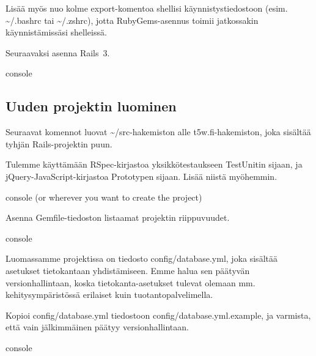 \documentclass{article}
\newcommand{\pdfforeignlanguage}[2]{\texorpdfstring{\foreignlanguage{#1}{#2}}{#2}}
\newcommand{\eng}[1]{\pdfforeignlanguage{english}{#1}}
\begin{document}
Lisää myös nuo kolme export-komentoa shellisi käynnistystiedostoon (esim.
\textasciitilde/.bashrc tai \textasciitilde/.zshrc), jotta RubyGems-asennus
toimii jatkossakin käynnistämissäsi shelleissä.

\begin{samepage}
Seuraavaksi asenna Rails~3.

\begin{pygmented}{console}
\end{pygmented}
\end{samepage}

\subsection{Uuden projektin luominen}

\begin{samepage}
Seuraavat komennot luovat \textasciitilde/src-hakemiston alle
t5w.fi-hakemiston, joka sisältää tyhjän Rails-projektin puun.

Tulemme käyttämään RSpec-kirjastoa yksikkötestaukseen TestUnitin sijaan, ja
jQuery-JavaScript-kirjastoa Prototypen sijaan. Lisää niistä myöhemmin.

\begin{pygmented}{console}
(or wherever you want to create the project)

\end{pygmented}
\end{samepage}

\begin{samepage}
Asenna Gemfile-tiedoston listaamat projektin riippuvuudet.

\begin{pygmented}{console}
\end{pygmented}
\end{samepage}

Luomassamme projektissa on tiedosto \eng{config/database.yml}, joka sisältää
asetukset tietokantaan yhdistämiseen. Emme halua sen päätyvän
versionhallintaan, koska tietokanta-asetukset tulevat olemaan mm.
kehitysympäristössä erilaiset kuin tuotantopalvelimella.

\begin{samepage}
Kopioi \eng{config/database.yml} tiedostoon \eng{config/database.yml.example},
ja varmista, että vain jälkimmäinen päätyy versionhallintaan.

\begin{pygmented}{console}
\end{pygmented}
\end{samepage}
\end{document}
